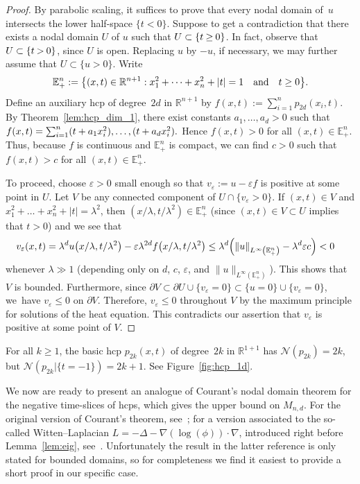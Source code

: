 \documentclass[AHL,Unicode,longabstracts,published]{cedram}
\newcommand{\R}{\mathbb{R}}
\newcommand{\bbE}{\mathbb{E}}
\newcommand{\norm}[1]{\left \lVert #1 \right \rVert}
\newcommand{\nodal}{\mathcal{N}}
\renewcommand{\epsilon}{\varepsilon}
\newcommand*{\mk}{\mkern -1mu}
\let\originalleft\left
\let\originalright\right
\renewcommand{\left}{\mathopen{}\mathclose\bgroup\originalleft}
\renewcommand{\right}{\aftergroup\egroup\originalright}
\newcommand{\R}{\mathbb{R}}
\begin{document}
\begin{proof}
By parabolic scaling, it suffices to prove that every nodal domain of~$u$ intersects the lower half-space $\{t<0\}$. Suppose to get a contradiction that there exists a nodal domain $U$ of $u$ such that $U\subset\{t\mk\geq\mk 0\}$. In fact, observe that ${U\subset\{t\mk>\mk0\}}$, since $U$ is open. Replacing $u$ by $-u$, if necessary, we may further assume that $U\subset\{u>0\}$. Write
\[
\bbE^n_+:=\left\{(x,t)\in\R^{n+1}:x_1^2+\dots+x_n^2+|t|=1\quad \text{and}\quad t\geq 0\right\}.
\]
Define an auxiliary hcp of degree~$2d$ in $\R^{n+1}$ by $f(x,t):=\sum_{i=1}^n p_{2d}(x_i,t)$. By Theorem~\ref{lem:hcp_dim_1}, there exist constants $a_1,\dots,a_d>0$ such that $f(x,t)=\sum_{i=1}^n (t+a_1x_i^2),\dots,\linebreak (t+a_dx_i^2).$ Hence $f(x,t)>0$ for all $(x,t)\in \bbE^n_+$. Thus, because $f$ is continuous and $\bbE^n_+$ is compact, we can find $c>0$ such that $f(x,t)>c$ for all $(x,t)\in \bbE^n_+$.

To proceed, choose $\epsilon>0$ small enough so that $v_\epsilon := u - \epsilon f$ is positive at some point in $U$. Let $V$ be any connected component of $U\cap\{v_\epsilon>0\}$. If $(x,t)\in V$ and $x_1^2+\dots+x_n^2+|t|=\lambda^2$, then $(x/\lambda,t/\lambda^2)\in \bbE^n_+$ {(since $(x,t) \in V \subset U$ implies that $t > 0$)} and we see that
\begin{align*}
v_\epsilon(x,t) & = \lambda^d u\left(x/\lambda, t/\lambda^2\right) - \epsilon \lambda^{2d} f\left(x/\lambda, t/\lambda^2\right) \le \lambda^d\left(\norm{u}_{L^\infty\left(\bbE^n_+\right)} - \lambda^{d} \epsilon c\right) < 0
\end{align*}
whenever $\lambda\gg 1$ (depending only on $d$, $c$, $\epsilon$, and $\|u\|_{L^\infty(\bbE^n_+)}$). This shows that $V$ is bounded. Furthermore, since $\partial V\subset \partial U\cup \{v_\epsilon=0\}\subset\{u=0\}\cup\{v_\epsilon=0\}$, we~have $v_\epsilon\leq 0$ on $\partial V$. Therefore, $v_\epsilon\leq 0$ throughout $V$ by the maximum principle for solutions of the heat equation. This contradicts our assertion that $v_\epsilon$ is positive at some point of $V$.
\end{proof}

\begin{exam}
For all $k\geq 1$, the basic hcp $p_{2k}(x,t)$ of degree~$2k$ in $\R^{1+1}$ has $\nodal(p_{2k})=2k$, but $\nodal(p_{2k}|\{t=-1\})=2k+1$. See Figure~\ref{fig:hcp_1d}.
\end{exam}


We now are ready to present an analogue of Courant's nodal domain theorem for the negative time-slices of hcps, which gives the upper bound on $M_{n,d}$. For the original version of Courant's theorem, see~\cite[Chapter~VI, Section~6]{CH}; {for a version associated to the so-called Witten--Laplacian $L = -\Delta - \nabla(\log(\phi)) \cdot \nabla$, introduced right before Lemma~\ref{lem:eig}, see~\cite{CM25}. Unfortunately the result in the latter reference is only stated for bounded domains, so for completeness we find it easiest to provide a short proof in our specific case.}
\end{document}
